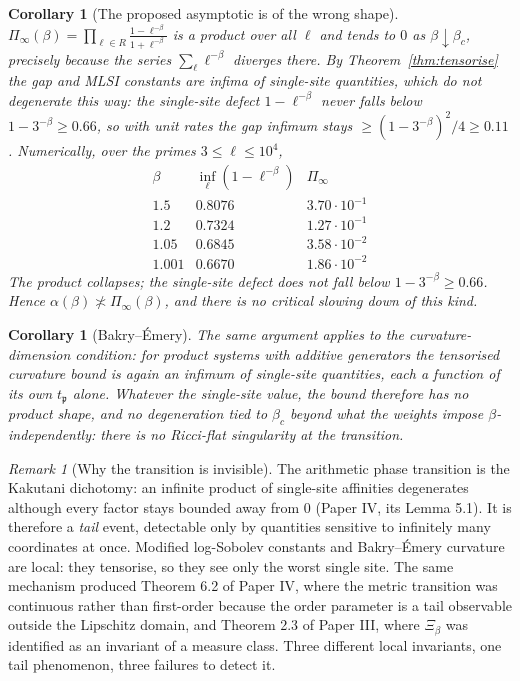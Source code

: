 \documentclass[11pt]{amsart}
\numberwithin{equation}{section}
\newtheorem{corollary}[theorem]{Corollary}
\theoremstyle{definition}
\theoremstyle{remark}
\newtheorem{remark}[theorem]{Remark}
\newcommand{\pp}{\mathfrak{p}}
\begin{document}
\begin{corollary}[The proposed asymptotic is of the wrong shape]\label{cor:wrongshape}
$\Pi_\infty(\beta)=\prod_{\ell\in R}\frac{1-\ell^{-\beta}}{1+\ell^{-\beta}}$ is a product over
all $\ell$ and tends to $0$ as $\beta\downarrow\beta_c$, precisely because the series
$\sum_\ell\ell^{-\beta}$ diverges there. By Theorem~\ref{thm:tensorise} the gap and MLSI
constants are infima of single-site quantities, which do not degenerate this way: the
single-site defect $1-\ell^{-\beta}$ never falls below $1-3^{-\beta}\ge0.66$, so with unit
rates the gap infimum stays $\ge(1-3^{-\beta})^2/4\ge0.11$. Numerically, over the primes
$3\le\ell\le10^4$,
\[
\begin{array}{lcc}
\beta & \inf_\ell(1-\ell^{-\beta}) & \Pi_\infty\\\hline
1.5 & 0.8076 & 3.70\cdot10^{-1}\\
1.2 & 0.7324 & 1.27\cdot10^{-1}\\
1.05 & 0.6845 & 3.58\cdot10^{-2}\\
1.001 & 0.6670 & 1.86\cdot10^{-2}
\end{array}
\]
The product collapses; the single-site defect does not fall below $1-3^{-\beta}\ge0.66$.
Hence $\alpha(\beta)\not\asymp\Pi_\infty(\beta)$, and there is no critical slowing down of
this kind.
\end{corollary}

\begin{corollary}[Bakry--\'Emery]\label{cor:BE}
The same argument applies to the curvature-dimension condition: for product systems with
additive generators the tensorised curvature bound is again an infimum of single-site
quantities, each a function of its own $t_\pp$ alone. Whatever the single-site value, the
bound therefore has no product shape, and no degeneration tied to $\beta_c$ beyond what the
weights impose $\beta$-independently: there is no Ricci-flat singularity at the transition.
\end{corollary}

\begin{remark}[Why the transition is invisible]\label{rem:invisible}
The arithmetic phase transition is the Kakutani dichotomy: an infinite product of
single-site affinities degenerates although every factor stays bounded away from $0$
(Paper IV, its Lemma 5.1). It is therefore a \emph{tail} event, detectable only by quantities
sensitive to infinitely many coordinates at once. Modified log-Sobolev constants and
Bakry--\'Emery curvature are local: they tensorise, so they see only the worst single site.
The same mechanism produced Theorem 6.2 of Paper IV, where the metric transition was
continuous rather than first-order because the order parameter is a tail observable outside
the Lipschitz domain, and Theorem 2.3 of Paper III, where $\Xi_\beta$ was identified as an
invariant of a measure class. Three different local invariants, one tail phenomenon, three
failures to detect it.
\end{remark}
\end{document}
